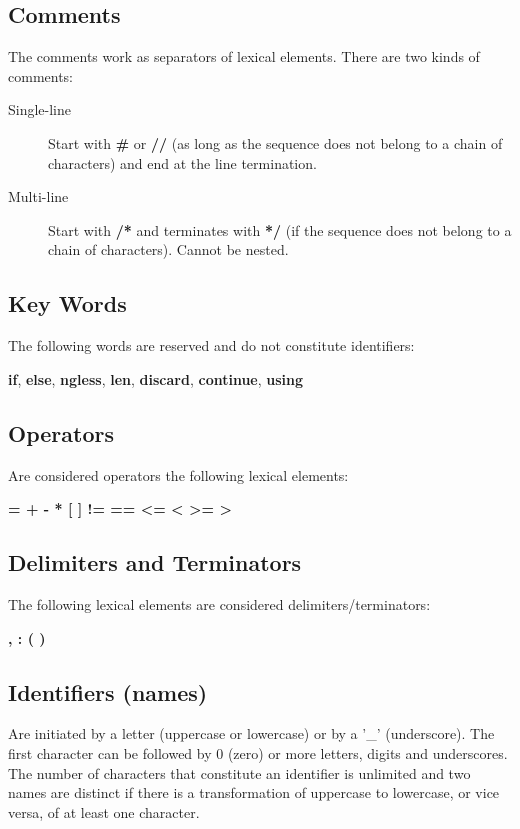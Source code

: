 \documentclass{article}
\begin{document}
\subsection{Comments}
\label{sec:comments}
The comments work as separators of lexical elements. There are two kinds of comments:

\begin{description}
\item[Single-line] Start with \textbf{\#} or \textbf{//} (as long as the sequence does not belong to a chain of characters) and end at the line termination.
\item[Multi-line] Start with \textbf{/*} and terminates with \textbf{*/} (if the sequence does not belong to a chain of characters). Cannot be nested.
\end{description}


\subsection{Key Words}

The following words are reserved and do not constitute identifiers: 
\begin{center}
\textbf{if}, \textbf{else}, \textbf{ngless}, \textbf{len}, \textbf{discard}, \textbf{continue}, \textbf{using}
\end{center}
\subsection{Operators}

Are considered operators the following lexical elements:
\begin{center}
    \textbf{= + - * [ ] != == <= < >= >}
\end{center}

\subsection{Delimiters and Terminators}

The following lexical elements are considered delimiters/terminators:
\begin{center}
    \textbf{, : ( )}
\end{center}    


\subsection{Identifiers (names)}
\label{sec:names}

Are initiated by a letter (uppercase or lowercase) or by a '\_' (underscore). The first character can be followed by 0 (zero) or more letters, digits and underscores. The number of characters that constitute an identifier is unlimited and two names are distinct if there is a transformation of uppercase to lowercase, or vice versa, of at least one character.
\end{document}
